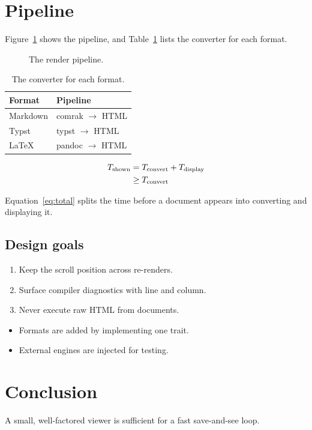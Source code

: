 \documentclass[a4paper,11pt]{article}
\theoremstyle{definition}
\begin{document}
\section{Pipeline}
Figure~\ref{fig:pipeline} shows the pipeline, and Table~\ref{tab:formats} lists the converter for each format.

\begin{figure}[h]
\centering
{}
\caption{The render pipeline.}
\label{fig:pipeline}
\end{figure}

\begin{table}[h]
\centering
\begin{tabular}{@{}ll@{}}
\toprule
Format   & Pipeline            \\
\midrule
Markdown & comrak $\to$ HTML   \\
Typst    & typst $\to$ HTML    \\
\LaTeX{} & pandoc $\to$ HTML   \\
\bottomrule
\end{tabular}
\caption{The converter for each format.}
\label{tab:formats}
\end{table}

\begin{align}
  T_{\text{shown}} &= T_{\text{convert}} + T_{\text{display}} \label{eq:total} \\
  &\ge T_{\text{convert}} \notag
\end{align}

Equation~\eqref{eq:total} splits the time before a document appears into converting and displaying it.

\subsection{Design goals}
\begin{enumerate}[label=(\roman*)]
  \item Keep the scroll position across re-renders.
  \item Surface compiler diagnostics with line and column.
  \item Never execute raw HTML from documents.
\end{enumerate}

\begin{itemize}[nosep]
  \item Formats are added by implementing one trait.
  \item External engines are injected for testing.
\end{itemize}

\section{Conclusion}
A small, well-factored viewer is sufficient for a fast save-and-see loop.



\end{document}
